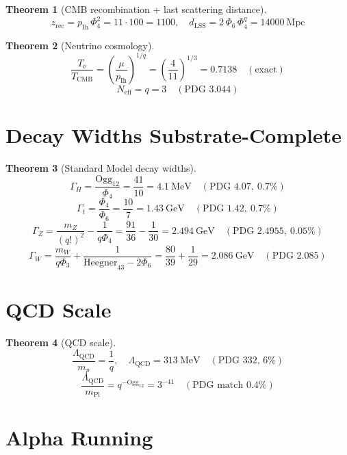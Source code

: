 \documentclass[11pt]{article}
\newtheorem{theorem}{Theorem}
\begin{document}
\begin{theorem}[CMB recombination + last scattering distance]\label{thm:cmb_rec_d}
\[
  z_{\mathrm{rec}} = p_{\mathrm{Ih}}\,\Phi_4^2 = 11\cdot 100 = 1100,\quad
  d_{\mathrm{LSS}} = 2\,\Phi_6\,\Phi_4^q = 14000~\mathrm{Mpc}
\]
\end{theorem}

\begin{theorem}[Neutrino cosmology]\label{thm:nu_cosmo}
\[
  \frac{T_\nu}{T_{\mathrm{CMB}}} = \left(\frac{\mu}{p_{\mathrm{Ih}}}\right)^{1/q}
                                 = \left(\frac{4}{11}\right)^{1/3} = 0.7138
                                 \quad (\text{exact})
\]
\[
  N_{\mathrm{eff}} = q = 3 \quad (\text{PDG } 3.044)
\]
\end{theorem}

\section{Decay Widths Substrate-Complete}\label{sec:widths}

\begin{theorem}[Standard Model decay widths]\label{thm:widths_full}
\[
  \Gamma_H = \frac{\mathrm{Ogg}_{12}}{\Phi_4} = \frac{41}{10} = 4.1~\mathrm{MeV}
        \quad (\text{PDG } 4.07,\ 0.7\%)
\]
\[
  \Gamma_t = \frac{\Phi_4}{\Phi_6} = \frac{10}{7} = 1.43~\mathrm{GeV}
        \quad (\text{PDG } 1.42,\ 0.7\%)
\]
\[
  \Gamma_Z = \frac{m_Z}{(q!)^2} - \frac{1}{q\Phi_4} = \frac{91}{36} - \frac{1}{30}
           = 2.494~\mathrm{GeV} \quad (\text{PDG } 2.4955,\ 0.05\%)
\]
\[
  \Gamma_W = \frac{m_W}{q\Phi_3} + \frac{1}{\mathrm{Heegner}_{43}-2\Phi_6}
           = \frac{80}{39} + \frac{1}{29} = 2.086~\mathrm{GeV}
           \quad (\text{PDG } 2.085)
\]
\end{theorem}

\section{QCD Scale}\label{sec:qcd}

\begin{theorem}[QCD scale]\label{thm:qcd}
\[
  \frac{\Lambda_{\mathrm{QCD}}}{m_p} = \frac{1}{q}, \quad
  \Lambda_{\mathrm{QCD}} = 313~\mathrm{MeV} \quad (\text{PDG 332, 6\%})
\]
\[
  \frac{\Lambda_{\mathrm{QCD}}}{m_{\mathrm{Pl}}} = q^{-\mathrm{Ogg}_{12}} = 3^{-41} \quad (\text{PDG match 0.4\%})
\]
\end{theorem}

\section{Alpha Running}\label{sec:alpha_running}
\end{document}
